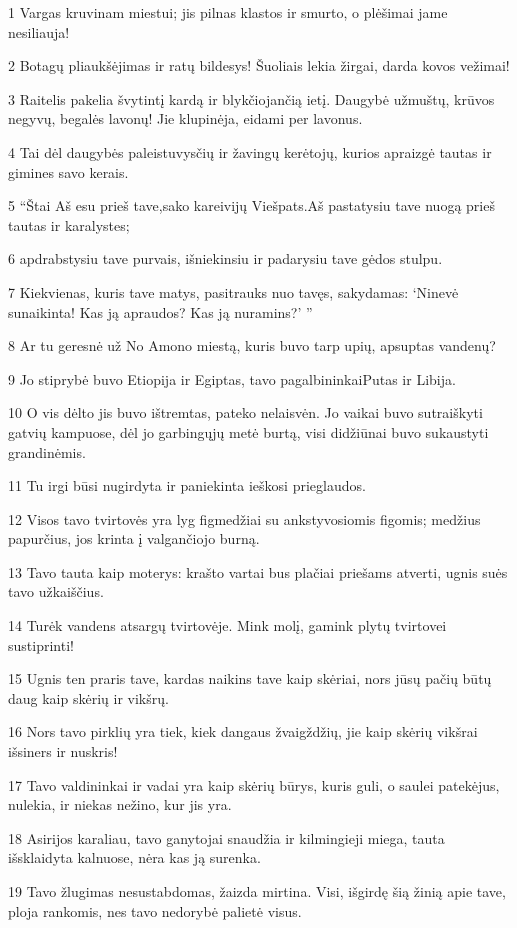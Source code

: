 \par 1 Vargas kruvinam miestui; jis pilnas klastos ir smurto, o plėšimai jame nesiliauja! 
\par 2 Botagų pliaukšėjimas ir ratų bildesys! Šuoliais lekia žirgai, darda kovos vežimai! 
\par 3 Raitelis pakelia švytintį kardą ir blykčiojančią ietį. Daugybė užmuštų, krūvos negyvų, begalės lavonų! Jie klupinėja, eidami per lavonus. 
\par 4 Tai dėl daugybės paleistuvysčių ir žavingų kerėtojų, kurios apraizgė tautas ir gimines savo kerais. 
\par 5 “Štai Aš esu prieš tave,­sako kareivijų Viešpats.­Aš pastatysiu tave nuogą prieš tautas ir karalystes; 
\par 6 apdrabstysiu tave purvais, išniekinsiu ir padarysiu tave gėdos stulpu. 
\par 7 Kiekvienas, kuris tave matys, pasitrauks nuo tavęs, sakydamas: ‘Ninevė sunaikinta! Kas ją apraudos? Kas ją nuramins?’ ” 
\par 8 Ar tu geresnė už No Amono miestą, kuris buvo tarp upių, apsuptas vandenų? 
\par 9 Jo stiprybė buvo Etiopija ir Egiptas, tavo pagalbininkai­Putas ir Libija. 
\par 10 O vis dėlto jis buvo ištremtas, pateko nelaisvėn. Jo vaikai buvo sutraiškyti gatvių kampuose, dėl jo garbingųjų metė burtą, visi didžiūnai buvo sukaustyti grandinėmis. 
\par 11 Tu irgi būsi nugirdyta ir paniekinta ieškosi prieglaudos. 
\par 12 Visos tavo tvirtovės yra lyg figmedžiai su ankstyvosiomis figomis; medžius papurčius, jos krinta į valgančiojo burną. 
\par 13 Tavo tauta kaip moterys: krašto vartai bus plačiai priešams atverti, ugnis suės tavo užkaiščius. 
\par 14 Turėk vandens atsargų tvirtovėje. Mink molį, gamink plytų tvirtovei sustiprinti! 
\par 15 Ugnis ten praris tave, kardas naikins tave kaip skėriai, nors jūsų pačių būtų daug kaip skėrių ir vikšrų. 
\par 16 Nors tavo pirklių yra tiek, kiek dangaus žvaigždžių, jie kaip skėrių vikšrai išsiners ir nuskris! 
\par 17 Tavo valdininkai ir vadai yra kaip skėrių būrys, kuris guli, o saulei patekėjus, nulekia, ir niekas nežino, kur jis yra. 
\par 18 Asirijos karaliau, tavo ganytojai snaudžia ir kilmingieji miega, tauta išsklaidyta kalnuose, nėra kas ją surenka. 
\par 19 Tavo žlugimas nesustabdomas, žaizda mirtina. Visi, išgirdę šią žinią apie tave, ploja rankomis, nes tavo nedorybė palietė visus.



